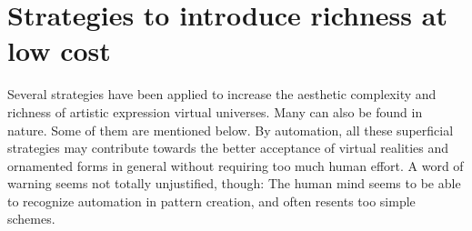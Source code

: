 \documentclass[rmp,amssymb,showpacs,showkeys,12pt,preprint]{revtex4}
\begin{document}
\section{Strategies to introduce richness at low cost}

Several strategies have been applied to increase the aesthetic complexity
and richness of artistic expression virtual universes. Many can also be found in nature. Some of
them are mentioned below. By automation, all these superficial strategies
may contribute towards the better acceptance of virtual realities and
ornamented forms in general without requiring too much human effort.
A word of warning seems not totally unjustified, though:
The human mind seems to be able to recognize automation in pattern creation, and often resents too simple schemes.
\end{document}
